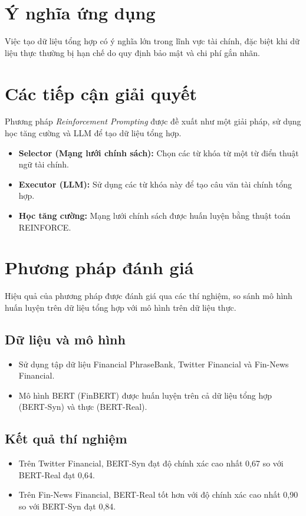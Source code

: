 \documentclass[a4paper,12pt]{article}
\begin{document}
\section{Ý nghĩa ứng dụng}
Việc tạo dữ liệu tổng hợp có ý nghĩa lớn trong lĩnh vực tài chính, đặc biệt khi dữ liệu thực thường bị hạn chế do quy định bảo mật và chi phí gắn nhãn.

\section{Các tiếp cận giải quyết}
Phương pháp \textit{Reinforcement Prompting} được đề xuất như một giải pháp, sử dụng học tăng cường và LLM để tạo dữ liệu tổng hợp.
\begin{itemize}
    \item \textbf{Selector (Mạng lưới chính sách):} Chọn các từ khóa từ một từ điển thuật ngữ tài chính.
    \item \textbf{Executor (LLM):} Sử dụng các từ khóa này để tạo câu văn tài chính tổng hợp.
    \item \textbf{Học tăng cường:} Mạng lưới chính sách được huấn luyện bằng thuật toán REINFORCE.
\end{itemize}

\section{Phương pháp đánh giá}
Hiệu quả của phương pháp được đánh giá qua các thí nghiệm, so sánh mô hình huấn luyện trên dữ liệu tổng hợp với mô hình trên dữ liệu thực.

\subsection{Dữ liệu và mô hình}
\begin{itemize}
    \item Sử dụng tập dữ liệu Financial PhraseBank, Twitter Financial và Fin-News Financial.
    \item Mô hình BERT (FinBERT) được huấn luyện trên cả dữ liệu tổng hợp (BERT-Syn) và thực (BERT-Real).
\end{itemize}

\subsection{Kết quả thí nghiệm}
\begin{itemize}
    \item Trên Twitter Financial, BERT-Syn đạt độ chính xác cao nhất 0,67 so với BERT-Real đạt 0,64.
    \item Trên Fin-News Financial, BERT-Real tốt hơn với độ chính xác cao nhất 0,90 so với BERT-Syn đạt 0,84.
\end{itemize}
\end{document}
